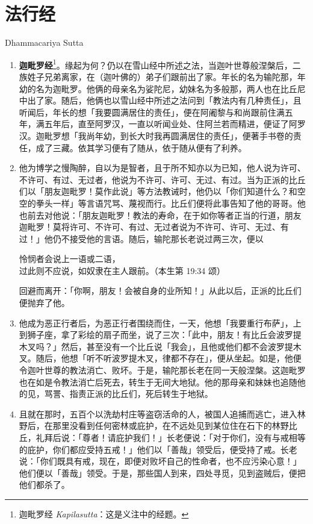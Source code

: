 \section{法行经}

\begin{center}Dhammacariya Sutta\end{center}\vspace{1em}

\begin{enumerate}\item \textbf{迦毗罗经}\footnote{迦毗罗经 \textit{Kapilasutta}：这是义注中的经题。}。缘起为何？仍以在雪山经中所述之法，当迦叶世尊般涅槃后，二族姓子兄弟离家，在（迦叶佛的）弟子们跟前出了家。年长的名为输陀那，年幼的名为迦毗罗。他俩的母亲名为娑陀尼，幼妹名为多般那，两人也在比丘尼中出了家。随后，他俩也以雪山经中所述之法问到「教法内有几种责任」，且听闻后，年长的想「我要圆满居住的责任」，便在阿阇黎与和尚跟前住满五年，满五年后，直至阿罗汉，一直以听闻业处、住阿兰若而精进，便证了阿罗汉。迦毗罗想「我尚年幼，到长大时我再圆满居住的责任」，便著手书卷的责任，成了三藏。依其学习便有了随从，依于随从便有了利养。
\item 他为博学之慢陶醉，自以为是智者，且于所不知亦以为已知，他人说为许可、不许可、有过、无过者，他说为不许可、许可、无过、有过。当为正派的比丘们以「朋友迦毗罗！莫作此说」等方法教诫时，他仍以「你们知道什么？和空空的拳头一样」等言语咒骂、蔑视而行。比丘们便将此事告知了他的哥哥。他也前去对他说：「朋友迦毗罗！教法的寿命，在于如你等者正当的行道，朋友迦毗罗！莫将许可、不许可、有过、无过者说为不许可、许可、无过、有过！」他仍不接受他的言语。随后，输陀那长老说过两三次，便以\begin{quoting}怜悯者会说上一语或二语，\\过此则不应说，如奴隶在主人跟前。（本生第 19:34 颂）\end{quoting}回避而离开：「你啊，朋友！会被自身的业所知！」从此以后，正派的比丘们便抛弃了他。
\item 他成为恶正行者后，为恶正行者围绕而住，一天，他想「我要重行布萨」，上到狮子座，拿了彩绘的扇子而坐，说了三次：「此中，朋友！有比丘会波罗提木叉吗？」然后，甚至没有一个比丘说「我会」，且他或他们都不会波罗提木叉。随后，他想「听不听波罗提木叉，律都不存在」，便从坐起。如是，他便令迦叶世尊的教法消亡、败坏。于是，输陀那长老在同一天般涅槃。这迦毗罗也在如是令教法消亡后死去，转生于无间大地狱。他的那母亲和妹妹也追随他的见，骂詈、指责正派的比丘们，死后转生于地狱。
\item 且就在那时，五百个以洗劫村庄等盗窃活命的人，被国人追捕而逃亡，进入林野后，在那里没看到任何密林或庇护，在不远处见到某位住在石下的林野比丘，礼拜后说：「尊者！请庇护我们！」长老便说：「对于你们，没有与戒相等的庇护，你们都应受持五戒！」他们以「善哉」领受后，便受持了戒。长老说：「你们既具有戒，现在，即便对败坏自己的性命者，也不应污染心意！」他们便以「善哉」领受。于是，那些国人到来，四处寻觅，见到盗贼后，便把他们都杀了。

\end{enumerate}
